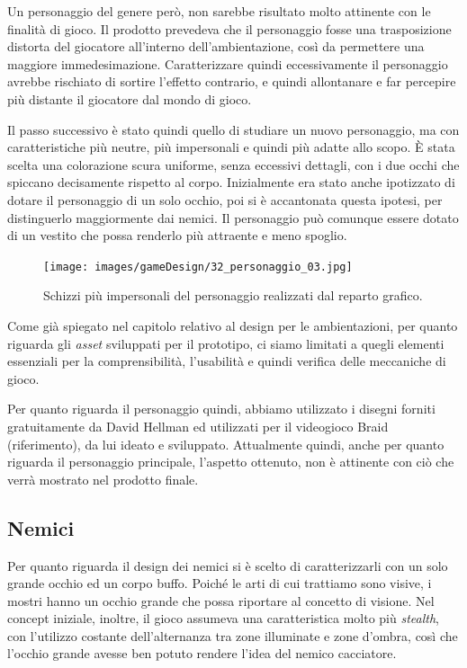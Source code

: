 Un personaggio del genere però, non sarebbe risultato molto attinente con le finalità di gioco. Il prodotto prevedeva che il personaggio fosse una trasposizione distorta del giocatore all’interno dell’ambientazione, così da permettere una maggiore immedesimazione. Caratterizzare quindi eccessivamente il personaggio avrebbe rischiato di sortire l’effetto contrario, e quindi allontanare e far percepire più distante il giocatore dal mondo di gioco.

Il passo successivo è stato quindi quello di studiare un nuovo personaggio, ma con caratteristiche più neutre, più impersonali e quindi più adatte allo scopo.
È stata scelta una colorazione scura uniforme, senza eccessivi dettagli, con i due occhi che spiccano decisamente rispetto al corpo. Inizialmente era stato anche ipotizzato di dotare il personaggio di un solo occhio, poi si è accantonata questa ipotesi, per distinguerlo maggiormente dai nemici. Il personaggio può comunque essere dotato di un vestito che possa renderlo più attraente e meno spoglio.

\begin{figure}%
	\centering
	\texttt{[image: images/gameDesign/32\_personaggio\_03.jpg]}
	\caption{Schizzi più impersonali del personaggio realizzati dal reparto grafico.}
	\label{fig:ambientazione_personaggio_02}
\end{figure}

Come già spiegato nel capitolo relativo al design per le ambientazioni, per quanto riguarda gli \textit{asset} sviluppati per il prototipo, ci siamo limitati a quegli elementi essenziali per la comprensibilità, l’usabilità e quindi verifica delle meccaniche di gioco.

Per quanto riguarda il personaggio quindi, abbiamo utilizzato i disegni forniti gratuitamente da David Hellman \cite{DavidHellmanSite} ed utilizzati per il videogioco Braid (riferimento), da lui ideato e sviluppato.
Attualmente quindi, anche per quanto riguarda il personaggio principale, l’aspetto ottenuto, non è attinente con ciò che verrà mostrato nel prodotto finale.

\subsection{Nemici}
\label{sec:nemici}

Per quanto riguarda il design dei nemici si è scelto di caratterizzarli con un solo grande occhio ed un corpo buffo. Poiché le arti di cui trattiamo sono visive, i mostri hanno un occhio grande che possa riportare al concetto di visione. Nel concept iniziale, inoltre, il gioco assumeva una caratteristica molto più \textit{stealth}, con l’utilizzo costante dell’alternanza tra zone illuminate e zone d’ombra, così che l’occhio grande avesse ben potuto rendere l’idea del nemico cacciatore.

